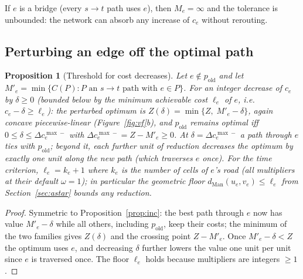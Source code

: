 \documentclass[10pt,twocolumn]{article}
\newtheorem{proposition}{Proposition}
\newcommand{\dman}{d_{\mathrm{Man}}}
\begin{document}
If $e$ is a bridge (every $s\!\to\!t$ path uses $e$), then $M_e=\infty$ and the tolerance is
unbounded: the network can absorb any increase of $c_e$ without rerouting.

\subsection{Perturbing an edge off the optimal path}

\begin{proposition}[Threshold for cost decreases]
\label{prop:dec}
Let $e\notin p_{\text{old}}$ and let $M'_e=\min\{C(P):P\text{ an $s\!\to\!t$ path with }
e\in P\}$. For an integer decrease of $c_e$ by $\delta\ge 0$ (bounded below by the minimum
achievable cost $\ell_e$ of $e$, i.e.\ $c_e-\delta\ge\ell_e$): the perturbed optimum is
$Z(\delta)=\min\{Z,\;M'_e-\delta\}$, again concave piecewise-linear
(Figure~\ref{fig:vf}b), and $p_{\text{old}}$ remains optimal iff
$0\le\delta\le\Delta c^{\max\!-}_e$ with
$\Delta c^{\max\!-}_e = Z - M'_e \ge 0$.
At $\delta=\Delta c^{\max\!-}_e$ a path through $e$ ties with $p_{\text{old}}$; beyond it,
each further unit of reduction decreases the optimum by exactly one unit along the new path
(which traverses $e$ once). For the time criterion,
$\ell_e=k_e+1$ where $k_e$ is the number of cells of $e$'s road (all multipliers at their
default $\omega=1$); in particular the geometric floor
$\dman(u_e,v_e)\le\ell_e$ from Section~\ref{sec:astar} bounds any reduction.
\end{proposition}
\begin{proof}
Symmetric to Proposition~\ref{prop:inc}: the best path through $e$ now has value
$M'_e-\delta$ while all others, including $p_{\text{old}}$, keep their costs; the minimum
of the two families gives $Z(\delta)$ and the crossing point $Z-M'_e$. Once
$M'_e-\delta<Z$ the optimum uses $e$, and decreasing $\delta$ further lowers the value one
unit per unit since $e$ is traversed once. The floor $\ell_e$ holds because multipliers are
integers $\ge 1$.
\end{proof}
\end{document}
